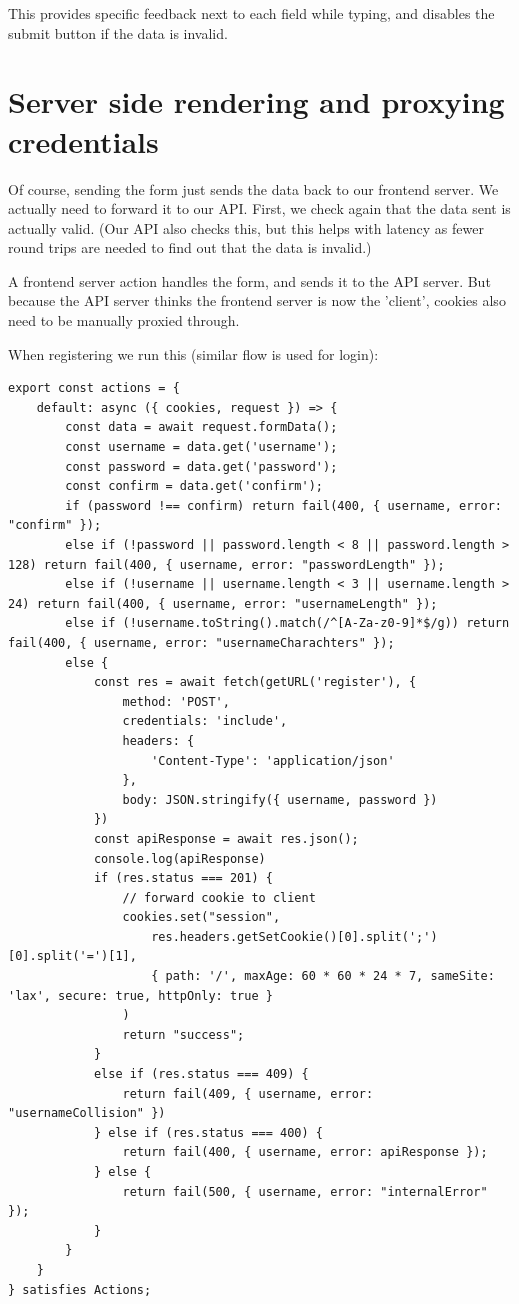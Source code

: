 \documentclass{report}
\begin{document}
This provides specific feedback next to each field while typing, and disables the submit button if the data is invalid.

\section{Server side rendering and proxying credentials}

Of course, sending the form just sends the data back to our frontend server. We actually need to forward it to our API.
First, we check again that the data sent is actually valid. (Our API also checks this, but this helps with latency as fewer round trips are needed to find out that the data is invalid.)

A frontend server action handles the form, and sends it to the API server. But because the API server thinks the frontend server is now the 'client', cookies also need to be manually proxied through.

When registering we run this (similar flow is used for login):

\begin{verbatim}
export const actions = {
	default: async ({ cookies, request }) => {
		const data = await request.formData();
		const username = data.get('username');
		const password = data.get('password');
		const confirm = data.get('confirm');
		if (password !== confirm) return fail(400, { username, error: "confirm" });
		else if (!password || password.length < 8 || password.length > 128) return fail(400, { username, error: "passwordLength" });
		else if (!username || username.length < 3 || username.length > 24) return fail(400, { username, error: "usernameLength" });
		else if (!username.toString().match(/^[A-Za-z0-9]*$/g)) return fail(400, { username, error: "usernameCharachters" });
		else {
			const res = await fetch(getURL('register'), {
				method: 'POST',
				credentials: 'include',
				headers: {
					'Content-Type': 'application/json'
				},
				body: JSON.stringify({ username, password })
			})
			const apiResponse = await res.json();
			console.log(apiResponse)
			if (res.status === 201) {
				// forward cookie to client
				cookies.set("session",
					res.headers.getSetCookie()[0].split(';')[0].split('=')[1],
					{ path: '/', maxAge: 60 * 60 * 24 * 7, sameSite: 'lax', secure: true, httpOnly: true }
				)
				return "success";
			}
			else if (res.status === 409) {
				return fail(409, { username, error: "usernameCollision" })
			} else if (res.status === 400) {
				return fail(400, { username, error: apiResponse });
			} else {
				return fail(500, { username, error: "internalError" });
			}
		}
	}
} satisfies Actions;
\end{verbatim}
\end{document}
